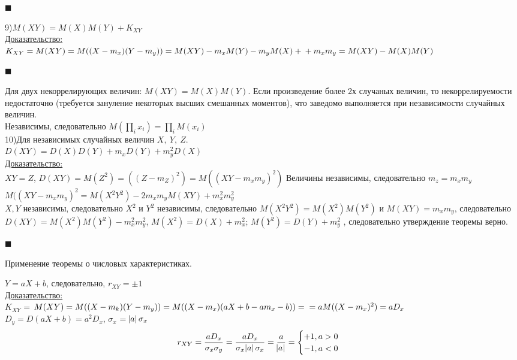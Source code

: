 \documentclass[russian, 12pt, fleqn,x11names]{article}
\begin{document}
\begin{flushright}\(\blacksquare\)\end{flushright}
9)$M(XY)=M(X)M(Y)+K_{XY}$\\
\underline{Доказательство:}\\
$K_{XY} = M(XY) = M((X-m_x)(Y-m_y)) = M(XY)  - m_xM(Y) - m_y M(X) +\\+ m_xm_y  = M(XY) - M(X)M(Y)$
\begin{flushright}\(\blacksquare\)\end{flushright}
Для двух некоррелирующих величин: $M(XY) = M(X)M(Y)$. Если произведение более 2х случаных величин, то некоррелируемости недостаточно (требуется зануление некоторых высших смешанных моментов), что заведомо выполняется при независимости случайных величин.\\
Независимы, следовательно $\displaystyle{ M(\prod_{i}x_i) = \prod_{i} M(x_i)}$\\
10)Для независимых случайных величин $X,\ Y,\ Z$.\\
$D(XY)=D(X)D(Y) + m_xD(Y) + m_y^2D(X)$ \\
\underline{Доказательство:}\\
$XY=Z$, $D(XY)=M(Z^2)=((Z-m_Z)^2) = M((XY-m_xm_y)^2)$
Величины независимы, следовательно $m_z=m_xm_y$\\
$M((XY-m_xm_y)^2 = M(X^2Y^2) - 2m_xm_y M(XY) + m_x^2 m_y^2$\\
$X, Y$ независимы, следовательно $X^2$ и $Y^2$ независимы, следовательно $M(X^2Y^2) =M(X^2)M(Y^2)$ и $M(XY) = m_x m_y$, следовательно \\
$D(XY) = M(X^2)M(Y^2) - m_x^2 m_y^2$, $M(X^2) = D(X) + m_x^2$; $M(Y^2) = D(Y) + m_y^2$ , следовательно утверждение теоремы верно.
\begin{flushright}\(\blacksquare\)\end{flushright}
\begin{center}
$\textbf{Применение теоремы о числовых характеристиках.}$
\end{center}
$Y=aX+b$, следовательно, $r_{XY}=\pm 1$\\
\underline{Доказательство:}\\	
$K_{XY}$ = $M(XY) = M((X-m_k)(Y-m_y))  = M((X-m_x)(aX + b - am_x - b)) =\\ = aM((X-m_x)^2) = aD_x$\\
$D_y = D(aX+b)  = a^2 D_x$, $\sigma_x$ = $\abs{a} \sigma_x$
\begin{equation*} 
r_{XY} = \frac{aD_x}{\sigma_x \sigma_y} = \frac{aD_x}{\sigma_x \abs{a} \sigma_x} = \frac{a}{\abs{a}}=
 \begin{cases}
  +1, a > 0\\
   -1, a < 0\\
 \end{cases}
\end{equation*}
\end{document}
